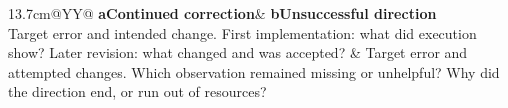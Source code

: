\begingroup
\figurefont\small
\begin{tabularx}{13.7cm}{@{}YY@{}}
\textbf{a\quad Continued correction}&
\textbf{b\quad Unsuccessful direction}\\
Target error and intended change.\newline
First implementation: what did execution show?\newline
Later revision: what changed and was accepted?
&
Target error and attempted changes.\newline
Which observation remained missing or unhelpful?\newline
Why did the direction end, or run out of resources?\\
\end{tabularx}
\par{}
\endgroup
